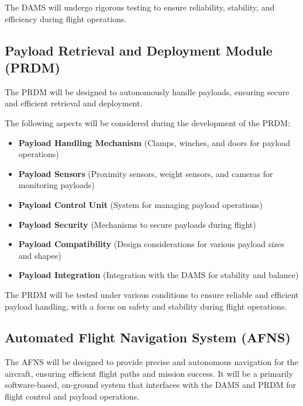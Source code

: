 \documentclass[12pt]{article}
\begin{document}
The DAMS will undergo rigorous testing to ensure reliability, stability, and efficiency during flight operations.

\subsection{Payload Retrieval and Deployment Module (PRDM)}
The PRDM will be designed to autonomously handle payloads, ensuring secure and efficient retrieval and deployment.

The following aspects will be considered during the development of the PRDM:
\begin{itemize}
    \item \textbf{Payload Handling Mechanism} (Clamps, winches, and doors for payload operations)
    \item \textbf{Payload Sensors} (Proximity sensors, weight sensors, and cameras for monitoring payloads)
    \item \textbf{Payload Control Unit} (System for managing payload operations)
    \item \textbf{Payload Security} (Mechanisms to secure payloads during flight)
    \item \textbf{Payload Compatibility} (Design considerations for various payload sizes and shapes)
    \item \textbf{Payload Integration} (Integration with the DAMS for stability and balance)
\end{itemize}

The PRDM will be tested under various conditions to ensure reliable and efficient payload handling, with a focus on safety and stability during flight operations.

\subsection{Automated Flight Navigation System (AFNS)}
The AFNS will be designed to provide precise and autonomous navigation for the aircraft, ensuring efficient flight paths and mission success. It will be a primarily software-based, on-ground system that interfaces with the DAMS and PRDM for flight control and payload operations.
\end{document}
